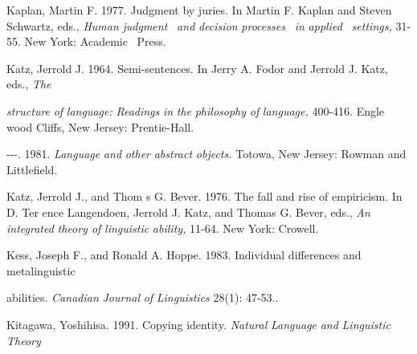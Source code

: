 \begin{styleStandard}
Kaplan, Martin F. 1977. Judgment by juries. In Martin F. Kaplan and Steven Schwartz, eds., \textit{Human}\textit{ }\textit{judgment }\textit{\ }\textit{and}\textit{ }\textit{decision}\textit{ }\textit{processes }\textit{\ }\textit{in}\textit{ }\textit{applied }\textit{\ }\textit{settings,}\textit{ }31-55. New York: Academic \ Press.
\end{styleStandard}


\begin{styleStandard}
Katz, Jerrold J. 1964. Semi-sentences. In Jerry A. Fodor and Jerrold J. Katz, eds., \textit{The}
\end{styleStandard}


\begin{styleStandard}
\textit{structure}\textit{ }\textit{of}\textit{ }\textit{language:}\textit{ }\textit{Readings}\textit{ }\textit{in}\textit{ }\textit{the}\textit{ }\textit{philosophy}\textit{ }\textit{of}\textit{ }\textit{language,}\textit{ }400-416. Engle\- wood Cliffs, New Jersey: Prentie-Hall.
\end{styleStandard}


\begin{styleStandard}
{}-{}-{}-. 1981. \textit{Language}\textit{ }\textit{and}\textit{ }\textit{other}\textit{ }\textit{abstract}\textit{ }\textit{objects.}\textit{ }Totowa, New Jersey: Rowman and Littlefield.
\end{styleStandard}


\begin{styleStandard}
Katz, Jerrold J., and Thom s G. Bever. 1976. The fall and rise of empiricism. In D. Ter\- ence Langendoen, Jerrold J. Katz, and Thomas G. Bever, eds., \textit{An}\textit{ }\textit{integrated}\textit{ }\textit{theory of}\textit{ }\textit{linguistic}\textit{ }\textit{ability,}\textit{ }11-64. New York: Crowell.
\end{styleStandard}


\begin{styleStandard}
Kess, Joseph F., and Ronald A. Hoppe. 1983. Individual differences and metalinguistic
\end{styleStandard}


\begin{styleStandard}
abilities. \textit{Canadian}\textit{ }\textit{Journal}\textit{ }\textit{of}\textit{ }\textit{Linguistics}\textit{ }28(1): 47-53..
\end{styleStandard}


\begin{styleStandard}
Kitagawa, Yoshihisa. 1991. Copying identity. \textit{Natural}\textit{ }\textit{Language}\textit{ }\textit{and}\textit{ }\textit{Linguistic}\textit{ }\textit{Theory}
\end{styleStandard}



